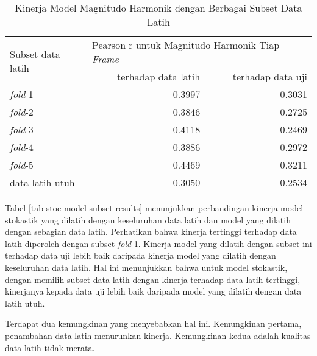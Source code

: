 \begin{table}[htbp]
    \centering
    \caption{Kinerja Model Magnitudo Harmonik dengan Berbagai Subset Data Latih}\label{tab-mag-model-subset-results}
    \begin{tabular}{ |l|r|r| } 
     \hline
     \multirow{2}{*}{Subset data latih} & \multicolumn{2}{l|}{Pearson r untuk Magnitudo Harmonik Tiap \textit{Frame}} \\
     \cline{2-3}
     & terhadap data latih & terhadap data uji \\\hline
	\textit{fold}-1      &0.3997  &0.3031\\\hline
	\textit{fold}-2      &0.3846  &0.2725\\\hline
	\textit{fold}-3      &0.4118  &0.2469\\\hline
	\textit{fold}-4      &0.3886  &0.2972\\\hline
	\textit{fold}-5      &0.4469  &0.3211\\\hline
	data latih utuh    	 &0.3050  &0.2534\\\hline
    \end{tabular}
\end{table}


Tabel \ref{tab-stoc-model-subset-results} menunjukkan perbandingan kinerja model stokastik yang dilatih dengan keseluruhan data latih dan model yang dilatih dengan sebagian data latih. Perhatikan bahwa kinerja tertinggi terhadap data latih diperoleh dengan subset \textit{fold}-1. Kinerja model yang dilatih dengan subset ini terhadap data uji lebih baik daripada kinerja model yang dilatih dengan keseluruhan data latih. Hal ini menunjukkan bahwa untuk model stokastik, dengan memilih subset data latih dengan kinerja terhadap data latih tertinggi, kinerjanya kepada data uji lebih baik daripada model yang dilatih dengan data latih utuh. 

Terdapat dua kemungkinan yang menyebabkan hal ini. Kemungkinan pertama, penambahan data latih menurunkan kinerja. Kemungkinan kedua adalah kualitas data latih tidak merata.

